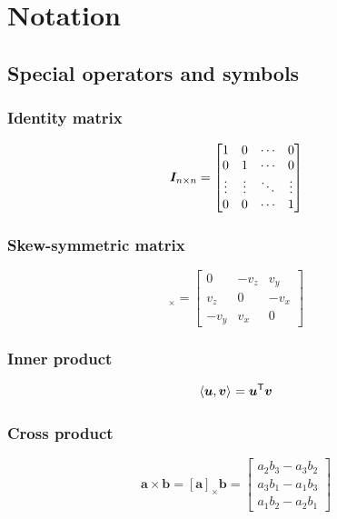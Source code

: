 \chapter{Notation}
\section{Special operators and symbols}
\subsection*{Identity matrix}
\begin{equation}
  \bm{I}_{n \times n}
  =
  \begin{bmatrix}
    1 & 0 & \cdots & 0 \\
    0 & 1 & \cdots & 0 \\
    \vdots & \vdots & \ddots & \vdots \\
    0 & 0 & \cdots & 1
  \end{bmatrix}
  \label{eq:identity_matrix}
\end{equation}

\subsection*{Skew-symmetric matrix}
\begin{equation}
  [\mathbf{v}]_\times =
  \begin{bmatrix}
    0 & -v_z & v_y \\
    v_z & 0 & -v_x \\
    -v_y & v_x & 0
  \end{bmatrix}
  \label{eq:skew_symmetric_matrix}
\end{equation}


\subsection*{Inner product}
\begin{equation}
  \left\langle \bm{u}, \bm{v} \right\rangle_{} = \bm{u}^{\mathsf{T}} \bm{v}
  \label{eq:inner_product}
\end{equation}

\subsection*{Cross product}
\begin{equation}
  \mathbf{a} \times \mathbf{b} = [\mathbf{a}]_\times \mathbf{b} = 
  \begin{bmatrix}
      a_2 b_3 - a_3 b_2 \\
      a_3 b_1 - a_1 b_3 \\
      a_1 b_2 - a_2 b_1
  \end{bmatrix}
  \label{eq:cross_product}
\end{equation}


